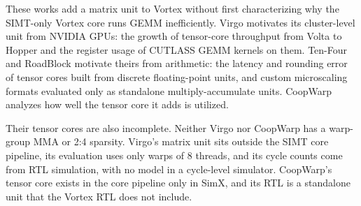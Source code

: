 These works add a matrix unit to Vortex without first characterizing why the SIMT-only Vortex core runs GEMM inefficiently. Virgo motivates its cluster-level unit from NVIDIA GPUs: the growth of tensor-core throughput from Volta to Hopper and the register usage of CUTLASS GEMM kernels on them. Ten-Four and RoadBlock motivate theirs from arithmetic: the latency and rounding error of tensor cores built from discrete floating-point units, and custom microscaling formats evaluated only as standalone multiply-accumulate units. CoopWarp analyzes how well the tensor core it adds is utilized.

Their tensor cores are also incomplete. Neither Virgo nor CoopWarp has a warp-group MMA or 2:4 sparsity. Virgo's matrix unit sits outside the SIMT core pipeline, its evaluation uses only warps of 8 threads, and its cycle counts come from RTL simulation, with no model in a cycle-level simulator. CoopWarp's tensor core exists in the core pipeline only in SimX, and its RTL is a standalone unit that the Vortex RTL does not include.

